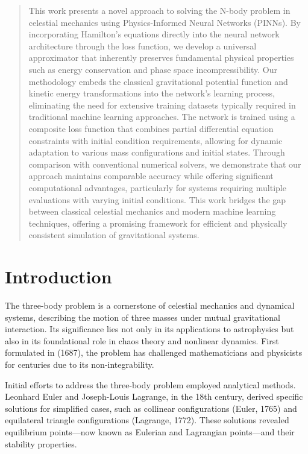 \documentclass[draft]{agujournal2019}
\begin{document}
\begin{abstract}
This work presents a novel approach to solving the N-body problem in celestial mechanics using Physics-Informed Neural Networks (PINNs). By incorporating Hamilton's equations directly into the neural network architecture through the loss function, we develop a universal approximator that inherently preserves fundamental physical properties such as energy conservation and phase space incompressibility. Our methodology embeds the classical gravitational potential function and kinetic energy transformations into the network's learning process, eliminating the need for extensive training datasets typically required in traditional machine learning approaches. The network is trained using a composite loss function that combines partial differential equation constraints with initial condition requirements, allowing for dynamic adaptation to various mass configurations and initial states. Through comparison with conventional numerical solvers, we demonstrate that our approach maintains comparable accuracy while offering significant computational advantages, particularly for systems requiring multiple evaluations with varying initial conditions. This work bridges the gap between classical celestial mechanics and modern machine learning techniques, offering a promising framework for efficient and physically consistent simulation of gravitational systems.
\end{abstract}

\section{Introduction}

The three-body problem is a cornerstone of celestial mechanics and dynamical systems, describing the motion of three masses under mutual gravitational interaction. Its significance lies not only in its applications to astrophysics but also in its foundational role in chaos theory and nonlinear dynamics. First formulated in \cite{newton1833philosophiae} (1687), the problem has challenged mathematicians and physicists for centuries due to its non-integrability.

Initial efforts to address the three-body problem employed analytical methods. Leonhard Euler and Joseph-Louis Lagrange, in the 18th century, derived specific solutions for simplified cases, such as collinear configurations \cite{euler} (Euler, 1765) and equilateral triangle configurations \cite{Lagrange}(Lagrange, 1772). These solutions revealed equilibrium points—now known as Eulerian and Lagrangian points—and their stability properties.
\end{document}

